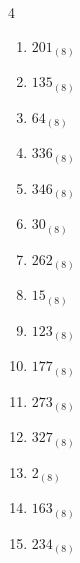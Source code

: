 \begin{multicols}{4}
\begin{enumerate}
        \phantom{$=110$}

  \item $201_{(8)}$

        \phantom{$=129$}

  \item $135_{(8)}$

        \phantom{$=93$}

  \item $64_{(8)}$

        \phantom{$=52$}

  \item $336_{(8)}$

        \phantom{$=222$}

\columnbreak %

  \item $346_{(8)}$

        \phantom{$=230$}

  \item $30_{(8)}$

        \phantom{$=24$}

  \item $262_{(8)}$

        \phantom{$=178$}

  \item $15_{(8)}$

        \phantom{$=13$}

  \item $123_{(8)}$

        \phantom{$=83$}

  \item $177_{(8)}$

        \phantom{$=127$}

  \item $273_{(8)}$

        \phantom{$=187$}

  \item $327_{(8)}$

        \phantom{$=215$}

  \item $2_{(8)}$

        \phantom{$=2$}

  \item $163_{(8)}$

        \phantom{$=115$}

  \item $234_{(8)}$

        \phantom{$=156$}


\end{enumerate}
\end{multicols}
